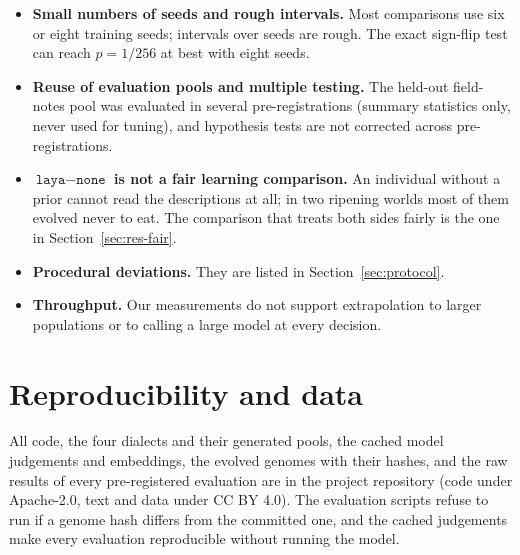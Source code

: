 \begin{itemize}
\item \textbf{Small numbers of seeds and rough intervals.} Most comparisons use six or eight training seeds; intervals over seeds are rough. The exact sign-flip test can reach $p=1/256$ at best with eight seeds.
\item \textbf{Reuse of evaluation pools and multiple testing.} The held-out field-notes pool was evaluated in several pre-registrations (summary statistics only, never used for tuning), and hypothesis tests are not corrected across pre-registrations.
\item \textbf{$\texttt{laya}-\texttt{none}$ is not a fair learning comparison.} An individual without a prior cannot read the descriptions at all; in two ripening worlds most of them evolved never to eat. The comparison that treats both sides fairly is the one in Section~\ref{sec:res-fair}.
\item \textbf{Procedural deviations.} They are listed in Section~\ref{sec:protocol}.
\item \textbf{Throughput.} Our measurements do not support extrapolation to larger populations or to calling a large model at every decision.
\end{itemize}
\section{Reproducibility and data}
All code, the four dialects and their generated pools, the cached model judgements and embeddings, the evolved genomes with their hashes, and the raw results of every pre-registered evaluation are in the project repository (code under Apache-2.0, text and data under CC BY 4.0). The evaluation scripts refuse to run if a genome hash differs from the committed one, and the cached judgements make every evaluation reproducible without running the model.
